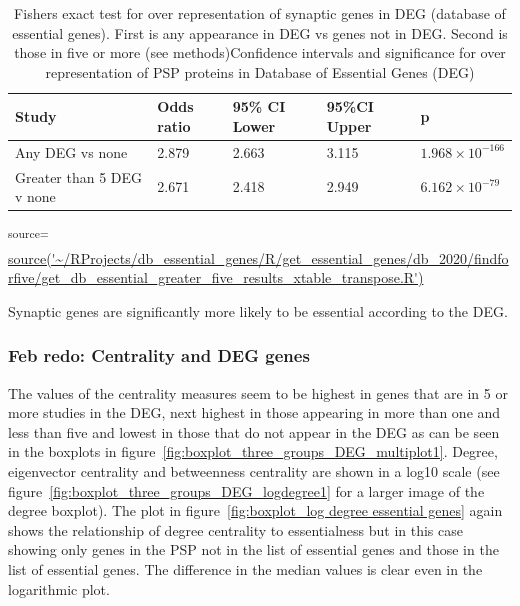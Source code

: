 \begin{table}[ht]
\centering
\begin{tabular}{lllll}

  \toprule
Study & Odds ratio & 95\% CI Lower & 95\%CI Upper & p \\ 
  \midrule
Any DEG vs none & 2.879 & 2.663 & 3.115 & $1.968 \times 10^{-166}$\vspace{1mm} \\ 
  Greater than 5 DEG v none & 2.671 & 2.418 & 2.949 & $6.162 \times 10^{-79}$\vspace{1mm} \\ 
   \bottomrule
\end{tabular}
\caption{Fishers exact test for over representation of synaptic genes in DEG (database of essential genes). First is any appearance in DEG vs genes not in DEG. Second is those in five or more (see methods)Confidence intervals and significance for over representation of PSP proteins in Database of Essential Genes (DEG)}
\tiny\textsuperscript{source=} \url{source('~/RProjects/db_essential_genes/R/get_essential_genes/db_2020/findforfive/get_db_essential_greater_five_results_xtable_transpose.R')}
\label{tab:Fishers exact results DEG}
\end{table}

Synaptic genes are significantly more likely to be essential according to the DEG.

\subsubsection{Feb redo: Centrality and DEG genes}


   

The values of the centrality measures seem to be highest in genes that are in 5 or more studies in the DEG, next highest in those appearing in more than one and less than five and lowest in those that do not appear in the DEG as can be seen in the boxplots in figure~\ref{fig:boxplot_three_groups_DEG_multiplot1}. Degree, eigenvector centrality and betweenness centrality are shown in a log10 scale (see figure~\ref{fig:boxplot_three_groups_DEG_logdegree1} for a larger image of the degree boxplot). The plot in figure~\ref{fig:boxplot_log degree essential genes} again shows the relationship of degree centrality to essentialness but in this case showing only genes in the PSP not in the list of essential genes and those in the list of essential genes. The difference in the median values is clear even in the logarithmic plot. 

